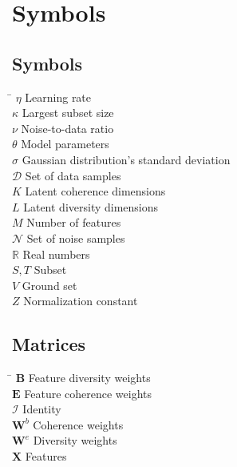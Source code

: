 \chapter*{Symbols}
\label{sec:symbols}


\section*{Symbols}

\begin{tabbing}
 \hspace*{1.6cm} \= \kill
 $\eta$ \> Learning rate \\ [0.5ex]
 $\kappa$ \> Largest subset size \\ [0.5ex]
 $\nu$ \> Noise-to-data ratio \\ [0.5ex]
 $\theta$ \> Model parameters \\ [0.5ex]
 $\sigma$ \> Gaussian distribution's standard deviation \\ [0.5ex]
 $\mathcal{D}$ \> Set of data samples \\ [0.5ex]
 $K$ \> Latent coherence dimensions \\ [0.5ex]
 $L$ \> Latent diversity dimensions \\ [0.5ex]
 $M$ \> Number of features \\ [0.5ex]
 $\mathcal{N}$ \> Set of noise samples \\ [0.5ex]
 $\mathbb{R}$ \> Real numbers \\ [0.5ex]
 $S,T$ \> Subset \\ [0.5ex]
 $V$ \> Ground set \\ [0.5ex]
 $Z$ \> Normalization constant \\ [0.5ex]
\end{tabbing}

\section*{Matrices}

\begin{tabbing}
  \hspace*{1.6cm} \= \kill
  $\mathbf{B}$ \> Feature diversity weights \\ [0.5ex]
  $\mathbf{E}$ \> Feature coherence weights \\ [0.5ex]
  $\mathcal{I}$ \> Identity \\ [0.5ex]
  $\mathbf{W}^{b}$ \> Coherence weights \\ [0.5ex]
  $\mathbf{W}^{e}$ \> Diversity weights \\ [0.5ex]
  $\mathbf{X}$ \> Features \\ [0.5ex]
\end{tabbing}

